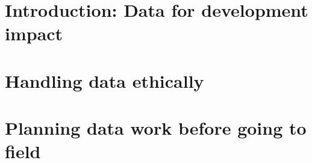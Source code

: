 %
%
%
%




\cleardoublepage
\chapter{Introduction: Data for development impact} %




\chapter{Handling data ethically}
\label{ch:1}




\chapter{Planning data work before going to field}
\label{ch:2}




